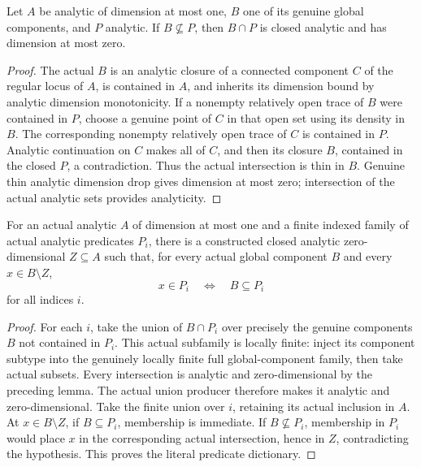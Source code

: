 \begin{lemma}
\label{hir:curve-predicates-proper-intersection}
\leanok
Let $A$ be analytic of dimension at most one, $B$ one of its genuine global
components, and $P$ analytic. If $B\not\subseteq P$, then $B\cap P$ is
closed analytic and has dimension at most zero.
\end{lemma}
\begin{proof}
The actual $B$ is an analytic closure of a connected component $C$ of the
regular locus of $A$, is contained in $A$, and inherits its dimension bound
by analytic dimension monotonicity. If a nonempty relatively open trace
of $B$ were contained in $P$, choose a genuine point of $C$ in that open
set using its density in $B$. The corresponding nonempty relatively open
trace of $C$ is contained in $P$. Analytic continuation on $C$ makes all
of $C$, and then its closure $B$, contained in the closed $P$, a contradiction.
Thus the actual intersection is thin in $B$. Genuine thin analytic
dimension drop gives dimension at most zero; intersection of the actual
analytic sets provides analyticity.
\end{proof}

\begin{theorem}
\label{hir:curve-predicates-finite-exception}
\leanok
For an actual analytic $A$ of dimension at most one and a finite indexed
family of actual analytic predicates $P_i$, there is a constructed closed
analytic zero-dimensional $Z\subseteq A$ such that, for every actual global
component $B$ and every $x\in B\setminus Z$,
\[
x\in P_i\quad\Longleftrightarrow\quad B\subseteq P_i
\]
for all indices $i$.
\end{theorem}
\begin{proof}
For each $i$, take the union of $B\cap P_i$ over precisely the genuine
components $B$ not contained in $P_i$. This actual subfamily is locally
finite: inject its component subtype into the genuinely locally finite
full global-component family, then take actual subsets. Every intersection
is analytic and zero-dimensional by the preceding lemma. The actual union
producer therefore makes it analytic and zero-dimensional. Take the finite
union over $i$, retaining its actual inclusion in $A$. At $x\in B\setminus Z$,
if $B\subseteq P_i$, membership is immediate. If $B\not\subseteq P_i$, membership
in $P_i$ would place $x$ in the corresponding actual intersection, hence in
$Z$, contradicting the hypothesis. This proves the literal predicate dictionary.
\end{proof}

